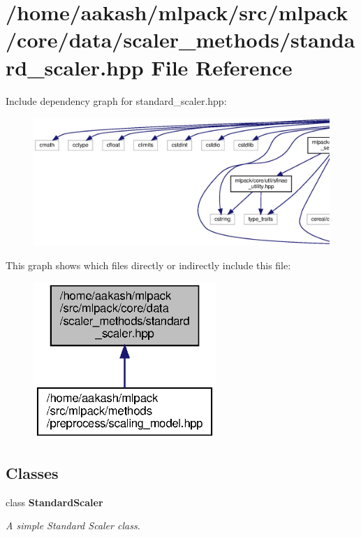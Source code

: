 \section{/home/aakash/mlpack/src/mlpack/core/data/scaler\+\_\+methods/standard\+\_\+scaler.hpp File Reference}
\label{standard__scaler_8hpp}
Include dependency graph for standard\+\_\+scaler.\+hpp\+:
\nopagebreak
\begin{figure}[H]
\begin{center}
\leavevmode
\includegraphics[width=350pt]{standard__scaler_8hpp__incl}
\end{center}
\end{figure}
This graph shows which files directly or indirectly include this file\+:
\nopagebreak
\begin{figure}[H]
\begin{center}
\leavevmode
\includegraphics[width=196pt]{standard__scaler_8hpp__dep__incl}
\end{center}
\end{figure}
\subsection*{Classes}
\begin{DoxyCompactItemize}
\item 
class \textbf{ Standard\+Scaler}
\begin{DoxyCompactList}\small\item\em A simple Standard Scaler class. \end{DoxyCompactList}\end{DoxyCompactItemize}
